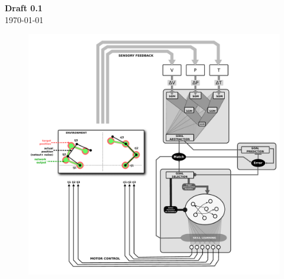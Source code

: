 \documentclass[12pt]{article}
\begin{document}
{\huge\bfseries Draft 0.1}\\[0.1cm] %

{\large \today}\\[3cm] %

\tableofcontents %

\begin{figure}[H]
    \centering
    \includegraphics[width=.8\textwidth]{schema}
    \caption{}
    \label{fig:}
\end{figure}
\end{document}
